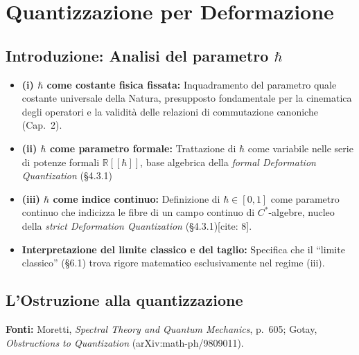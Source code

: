 \documentclass[12pt, a4paper]{article}
\newcommand{\fonti}[1]{%
	\begin{fontebox}
		\textcolor{fontecolor}{\footnotesize\textbf{Fonti:} #1}
	\end{fontebox}%
}
\begin{document}
	\newpage
	\section{Quantizzazione per Deformazione}
	
	\subsection{Introduzione: Analisi del parametro $\hbar$}
	
	\begin{itemize}
		\item \textbf{(i) $\hbar$ come costante fisica fissata:} Inquadramento del parametro quale costante universale della Natura, presupposto fondamentale per la cinematica degli operatori e la validità delle relazioni di commutazione canoniche (Cap.~2).
		\item \textbf{(ii) $\hbar$ come parametro formale:} Trattazione di $\hbar$ come variabile nelle serie di potenze formali $\mathbb{R}[[\hbar]]$, base algebrica della \textit{formal Deformation Quantization} (§4.3.1)
		\item \textbf{(iii) $\hbar$ come indice continuo:} Definizione di $\hbar \in [0, 1]$ come parametro continuo che indicizza le fibre di un campo continuo di $C^*$-algebre, nucleo della \textit{strict Deformation Quantization} (§4.3.1)[cite: 8].
		\item \textbf{Interpretazione del limite classico e del taglio:} Specifica che il ``limite classico'' (§6.1) trova rigore matematico esclusivamente nel regime (iii).
	\end{itemize}
	
	\subsection{L'Ostruzione alla quantizzazione}
	
	\fonti{Moretti, \textit{Spectral Theory and Quantum Mechanics}, p.~605; Gotay, \textit{Obstructions to Quantization} (arXiv:math-ph/9809011).}
	
\end{document}
